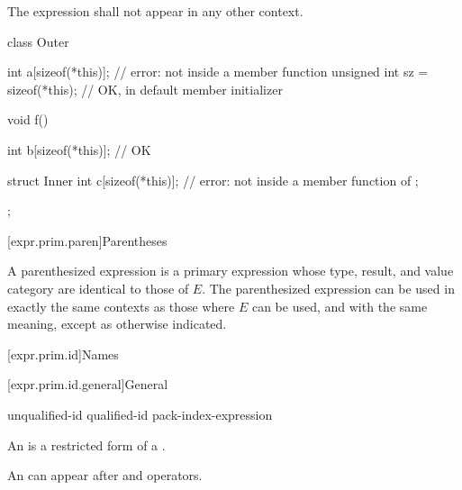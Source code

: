 \pnum
The expression  shall not appear in any other context.
\begin{example}
\begin{codeblock}
class Outer {
  int a[sizeof(*this)];                 // error: not inside a member function
  unsigned int sz = sizeof(*this);      // OK, in default member initializer

  void f() {
    int b[sizeof(*this)];               // OK

    struct Inner {
      int c[sizeof(*this)];             // error: not inside a member function of 
    };
  }
};
\end{codeblock}
\end{example}

[expr.prim.paren]{Parentheses}

\pnum
{}%
A parenthesized expression 
is a primary expression whose type, result, and value category are identical to those of $E$.
The parenthesized expression can be used in exactly the same contexts as
those where $E$ can be used, and with the same
meaning, except as otherwise indicated.

[expr.prim.id]{Names}

[expr.prim.id.general]{General}

\begin{bnf}
\br
    unqualified-id\br
    qualified-id\br
    pack-index-expression
\end{bnf}

\pnum
{}%
%
An  is a restricted form of a
.
\begin{note}
An  can appear after  and \tcode{->}
operators.
\end{note}

